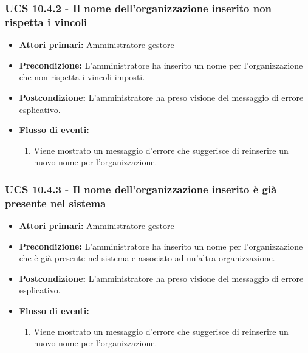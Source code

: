 \subsubsection{UCS 10.4.2 - Il nome dell'organizzazione inserito non rispetta i vincoli}%
\begin{itemize}
\item \textbf{Attori primari:} Amministratore gestore
\item \textbf{Precondizione:} L'amministratore ha inserito un nome per l'organizzazione che non rispetta i vincoli imposti.
\item \textbf{Postcondizione:} L'amministratore ha preso visione del messaggio di errore esplicativo.
\item \textbf{Flusso di eventi:}
    \begin{enumerate}
    \item Viene mostrato un messaggio d'errore che suggerisce di reinserire un nuovo nome per l'organizzazione.
    \end{enumerate} 
\end{itemize}

\subsubsection{UCS 10.4.3 - Il nome dell'organizzazione inserito è già presente nel sistema}%
\begin{itemize}
\item \textbf{Attori primari:} Amministratore gestore
\item \textbf{Precondizione:} L'amministratore ha inserito un nome per l'organizzazione che è già presente nel sistema e associato ad un'altra organizzazione.
\item \textbf{Postcondizione:} L'amministratore ha preso visione del messaggio di errore esplicativo.
\item \textbf{Flusso di eventi:}
    \begin{enumerate}
    \item Viene mostrato un messaggio d'errore che suggerisce di reinserire un nuovo nome per l'organizzazione.
    \end{enumerate} 
\end{itemize}

